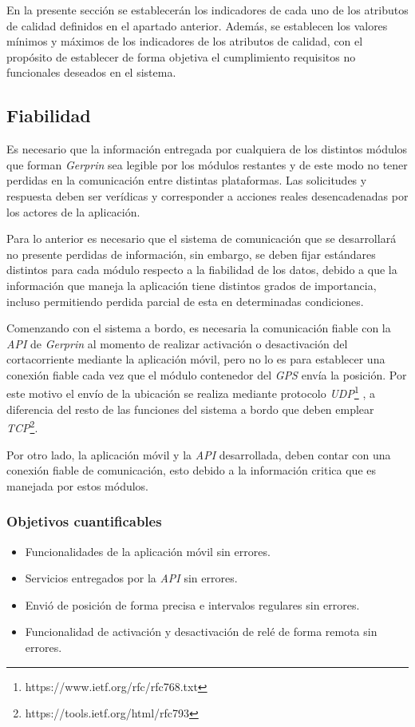 En la presente sección se establecerán los indicadores de cada uno de los atributos de calidad definidos en el apartado anterior. Además, se establecen los valores mínimos y máximos de los indicadores de los atributos de calidad, con el propósito de establecer de forma objetiva el cumplimiento requisitos no funcionales deseados en el sistema.

\subsection{Fiabilidad}

Es necesario que la información entregada por cualquiera de los distintos módulos que forman \textit{Gerprin} sea legible por los módulos restantes y de este modo no tener perdidas en la comunicación entre distintas plataformas. Las solicitudes y respuesta deben ser verídicas y corresponder a acciones reales desencadenadas por los actores de la aplicación.

Para lo anterior es necesario que el sistema de comunicación que se desarrollará no presente perdidas de información, sin embargo, se deben fijar estándares distintos para cada módulo respecto a la fiabilidad de los datos, debido a que la información que maneja la aplicación tiene distintos grados de importancia, incluso permitiendo perdida parcial de esta en determinadas condiciones.

Comenzando con el sistema a bordo, es necesaria la comunicación fiable con la \textit{API} de \textit{Gerprin} al momento de realizar activación o desactivación del cortacorriente mediante la aplicación móvil, pero no lo es para establecer una conexión fiable cada vez que el módulo contenedor del \textit{GPS} envía la posición. Por este motivo el envío de la ubicación se realiza mediante protocolo \textit{UDP}\footnote{https://www.ietf.org/rfc/rfc768.txt} , a diferencia del resto de las funciones del sistema a bordo que deben emplear \textit{TCP}\footnote{https://tools.ietf.org/html/rfc793}.

Por otro lado, la aplicación móvil y la \textit{API} desarrollada, deben contar con una conexión fiable de comunicación, esto debido a la información critica que es manejada por estos módulos.

\subsubsection{Objetivos cuantificables}

\begin{itemize}
	\item
	Funcionalidades de la aplicación móvil sin errores.
	\item
	Servicios entregados por la \textit{API} sin errores.
	\item
	Envió de posición de forma precisa e intervalos regulares sin errores.
	\item
	Funcionalidad de activación y desactivación de relé de forma remota sin errores.
\end{itemize}

